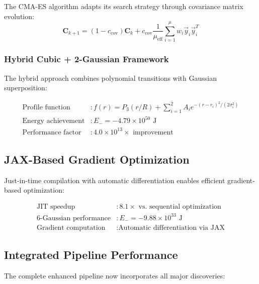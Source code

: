 \documentclass[11pt]{article}
\begin{document}
The CMA-ES algorithm adapts its search strategy through covariance matrix evolution:
\begin{equation}
\mathbf{C}_{k+1} = (1-c_{\text{cov}}) \mathbf{C}_k + c_{\text{cov}} \frac{1}{\mu_{\text{eff}}} \sum_{i=1}^{\mu} w_i \vec{y}_i \vec{y}_i^T
\end{equation}

\subsubsection{Hybrid Cubic + 2-Gaussian Framework}

The hybrid approach combines polynomial transitions with Gaussian superposition:

\begin{align}
\text{Profile function} &: f(r) = P_3(r/R) + \sum_{i=1}^{2} A_i e^{-(r-r_i)^2/(2\sigma_i^2)} \\
\text{Energy achievement} &: E_- = -4.79 \times 10^{50} \text{ J} \\
\text{Performance factor} &: 4.0 \times 10^{13} \times \text{ improvement}
\end{align}

\subsection{JAX-Based Gradient Optimization}

Just-in-time compilation with automatic differentiation enables efficient gradient-based optimization:

\begin{align}
\text{JIT speedup} &: 8.1 \times \text{ vs. sequential optimization} \\
\text{6-Gaussian performance} &: E_- = -9.88 \times 10^{33} \text{ J} \\
\text{Gradient computation} &: \text{Automatic differentiation via JAX}
\end{align}

\subsection{Integrated Pipeline Performance}

The complete enhanced pipeline now incorporates all major discoveries:
\end{document}
